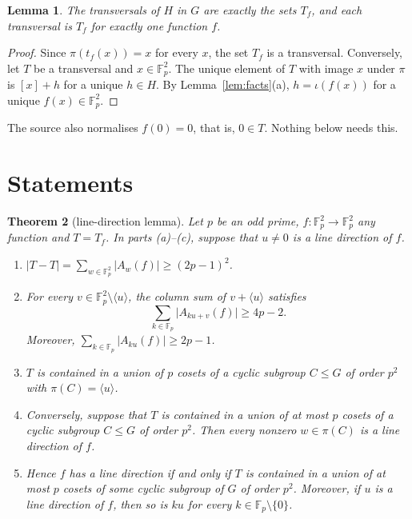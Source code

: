 \documentclass[11pt]{amsart}
\newtheorem{theorem}{Theorem}[section]
\newtheorem{lemma}[theorem]{Lemma}
\theoremstyle{definition}\newtheorem{definition}[theorem]{Definition}
\theoremstyle{remark}\newtheorem{remark}[theorem]{Remark}
\newcommand{\F}{\mathbb{F}}
\newcommand{\abs}[1]{\lvert #1\rvert}
\newcommand{\gen}[1]{\langle #1\rangle}
\begin{document}
\begin{lemma}\label{lem:Tf}
The transversals of \(H\) in \(G\) are exactly the sets \(T_f\), and each transversal is \(T_f\) for exactly one function \(f\).
\end{lemma}

\begin{proof}
Since \(\pi(t_f(x))=x\) for every \(x\), the set \(T_f\) is a transversal.
Conversely, let \(T\) be a transversal and \(x\in\F_p^2\).
The unique element of \(T\) with image \(x\) under \(\pi\) is \([x]+h\) for a unique \(h\in H\).
By Lemma~\ref{lem:facts}(a), \(h=\iota(f(x))\) for a unique \(f(x)\in\F_p^2\).
\end{proof}

The source also normalises \(f(0)=0\), that is, \(0\in T\).
Nothing below needs this.

\section{Statements}\label{sec:statements}

\begin{theorem}[line-direction lemma]\label{thm:main}
Let \(p\) be an odd prime, \(f\colon\F_p^2\to\F_p^2\) any function and \(T=T_f\).
In parts (a)--(c), suppose that \(u\ne0\) is a line direction of \(f\).
\begin{enumerate}
\item[(a)] \(\displaystyle\abs{T-T}=\sum_{w\in\F_p^2}\abs{A_w(f)}\ge(2p-1)^2\).
\item[(b)] For every \(v\in\F_p^2\setminus\gen{u}\), the column sum of \(v+\gen{u}\) satisfies
\[
\sum_{k\in\F_p}\abs{A_{ku+v}(f)}\ge4p-2 .
\]
Moreover, \(\sum_{k\in\F_p}\abs{A_{ku}(f)}\ge2p-1\).
\item[(c)] \(T\) is contained in a union of \(p\) cosets of a cyclic subgroup \(C\le G\) of order \(p^2\) with \(\pi(C)=\gen{u}\).
\item[(d)] Conversely, suppose that \(T\) is contained in a union of at most \(p\) cosets of a cyclic subgroup \(C\le G\) of order \(p^2\).
Then every nonzero \(w\in\pi(C)\) is a line direction of \(f\).
\item[(e)] Hence \(f\) has a line direction if and only if \(T\) is contained in a union of at most \(p\) cosets of some cyclic subgroup of \(G\) of order \(p^2\).
Moreover, if \(u\) is a line direction of \(f\), then so is \(ku\) for every \(k\in\F_p\setminus\{0\}\).
\end{enumerate}
\end{theorem}
\end{document}
